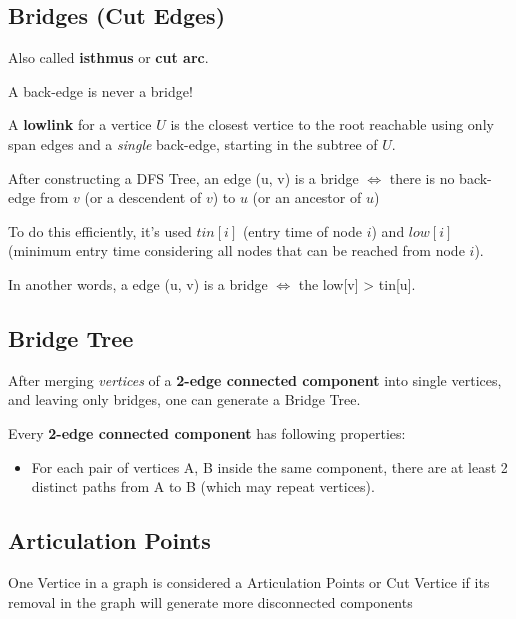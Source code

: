 	\subsection{Bridges (Cut Edges)}

		Also called \textbf{isthmus} or \textbf{cut arc}.
		
		A back-edge is never a bridge!
		
		A \textbf{lowlink} for a vertice $U$ is the closest vertice to the root reachable using only span edges and a \textit{single} back-edge, starting in the subtree of $U$.
		
		After constructing a DFS Tree, an edge (u, v) is a bridge $\iff$ there is no back-edge from $v$ (or a descendent of $v$) to $u$ (or an ancestor of $u$)
		
		To do this efficiently, it's used $tin[i]$ (entry time of node $i$) and $low[i]$ (minimum entry time considering all nodes that can be reached from node $i$).
		
		In another words, a edge (u, v) is a bridge $\iff$ the low[v] > tin[u].


	\subsection{Bridge Tree}

	After merging \textit{vertices} of a \textbf{2-edge connected component} into single vertices, and leaving only bridges, one can generate a Bridge Tree.

	Every \textbf{2-edge connected component} has following properties:

    \begin{itemize}
		\item For each pair of vertices {A, B} inside the same component, there are at least 2 distinct paths from A to B (which may repeat vertices).
	\end{itemize}

	
	\subsection{Articulation Points} 

	One Vertice in a graph is considered a Articulation Points or Cut Vertice if its removal in the graph will generate more disconnected components



